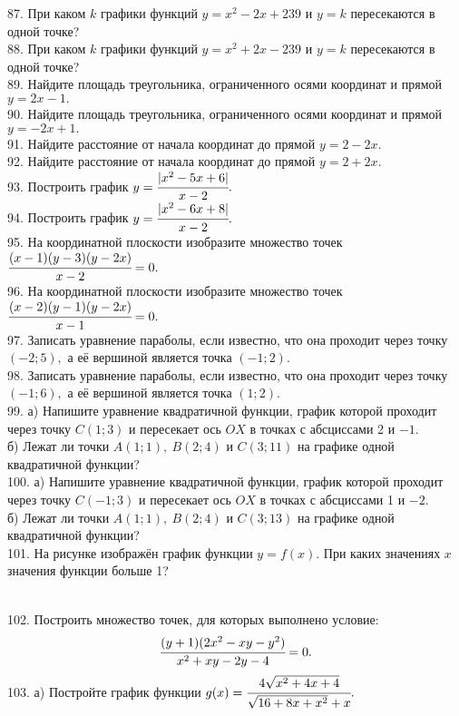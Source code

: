 87. При каком $k$ графики функций $y=x^2-2x+239$ и $y=k$ пересекаются в одной точке?\\
88. При каком $k$ графики функций $y=x^2+2x-239$ и $y=k$ пересекаются в одной точке?\\
89. Найдите площадь треугольника, ограниченного осями координат и прямой $y=2x-1.$\\
90. Найдите площадь треугольника, ограниченного осями координат и прямой $y=-2x+1.$\\
91. Найдите расстояние от начала координат до прямой $y=2-2x.$\\
92. Найдите расстояние от начала координат до прямой $y=2+2x.$\\
93. Построить график $y=\cfrac{|x^2-5x+6|}{x-2}.$\\
94. Построить график $y=\cfrac{|x^2-6x+8|}{x-2}.$\\
95. На координатной плоскости изобразите множество точек $\cfrac{(x-1)(y-3)(y-2x)}{x-2}=0.$\\
96. На координатной плоскости изобразите множество точек $\cfrac{(x-2)(y-1)(y-2x)}{x-1}=0.$\\
97. Записать уравнение параболы, если известно, что она проходит через точку $(-2;5),$ а её вершиной является точка $(-1;2).$\\
98. Записать уравнение параболы, если известно, что она проходит через точку $(-1;6),$ а её вершиной является точка $(1;2).$\\
99. а) Напишите уравнение квадратичной функции, график которой проходит через точку $C(1;3)$ и пересекает ось $OX$ в точках с абсциссами 2 и $-1.$\\
б) Лежат ли точки $A(1;1),\ B(2;4)$ и $C(3;11)$ на графике одной квадратичной функции?\\
100. а) Напишите уравнение квадратичной функции, график которой проходит через точку $C(-1;3)$ и пересекает ось $OX$ в точках с абсциссами 1 и $-2.$\\
б) Лежат ли точки $A(1;1),\ B(2;4)$ и $C(3;13)$ на графике одной квадратичной функции?\\
101. На рисунке изображён график функции $y=f(x).$ При каких значениях $x$ значения функции больше 1?
\begin{figure}[ht!]
\end{figure}\\
102. Построить множество точек, для которых выполнено условие:
$$\cfrac{(y+1)(2x^2-xy-y^2)}{x^2+xy-2y-4}=0.$$
103. а) Постройте график функции $g(x)=\cfrac{4\sqrt{x^2+4x+4}}{\sqrt{16+8x+x^2}+x}.$\\
